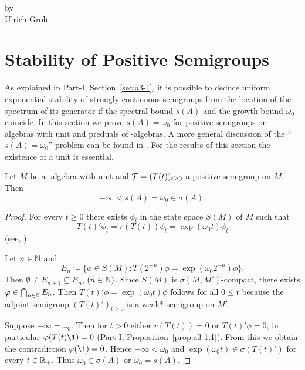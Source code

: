 \label{chap:d4}
\thispagestyle{empty}
{\Large
\vspace*{-.75cm}
by \\[.25em]
Ulrich Groh
\vspace{.75cm}
\\
}
\section{Stability of Positive Semigroups}\label{sec:d4-1}
As explained in Part-I, Section~\ref{sec:a3-1}, it is possible to deduce uniform exponential stability of strongly continuous semigroups from the location of the spectrum of its generator if the spectral bound $ s(A) $ and the growth bound $ \omega_{0} $ coincide.
In this section we prove $s(A) = \omega_{0}$ for positive semigroups on \CA-algebras with unit and preduals of \WA-algebras.
A more general discussion of the \enquote{$s(A) = \omega_{0}$} problem can be found in \textcite{greinervoigtwolff:1981}.
For the results of this section the existence of a unit is essential.
\begin{theorem}\label{thm:d4-1.1}
Let $M$ be a \CA-algebra with unit and $\TT = (T(t))_{t \geq 0}$ a positive semigroup on $M$.
Then
\[
	-\infty < s(A) = \omega_{0} \in \sigma(A).
\]
\end{theorem}
\begin{proof}
For every  $t \geq 0 $ there exists $\phi_{t}$ in the state space $S(M)$ of\/ $M$ such that
\[
	T(t)'\phi_{t} = r(T(t))\phi_{t} = \exp(\omega_{0} t)\phi_{t}
\]
(see, \eg \textcite[2.1]{groh:1981}).

Let $n \in \mathbb{N}$ and
\[
	E_{n} \coloneqq \{\phi \in S(M) \colon T(2^{-n})\phi = \exp(\omega_{0} 2^{-n})\phi \}.
\]
Then $\emptyset \neq E_{n+1} \subseteq E_{n}$,  $(n \in \mathbb{N})$.
Since $S(M)$ is $\sigma(M,M')$-compact, there exists $\phi \in \bigcap_{n \in \N} E_{n}$.
Then $ T(t)'\phi = \exp(\omega_{0} t)\phi$ follows for all $ 0 \leq t $ because the adjoint semigroup $(T(t)')_{t \geq 0}$ is a weak*-semigroup on $M'$.

Suppose $-\infty = \omega_{0}$.
Then for $t > 0$ either $r(T(t)) = 0$  or $T(t)'\phi = 0$, in particular $\phi(T(t)\1) = 0$ (Part-I, Proposition~\ref{prop:a3-1.1}).
From this we obtain the contradiction $\phi(\1) = 0$.
Hence $-\infty < \omega_{0}$ and $\exp(\omega_{0} t) \in \sigma(T(t)')$ for every $t \in \mathbb{R}_{+}$.
Thus $\omega_{0} \in \sigma(A)$ or $\omega_{0} = s(A)$.
\end{proof}
